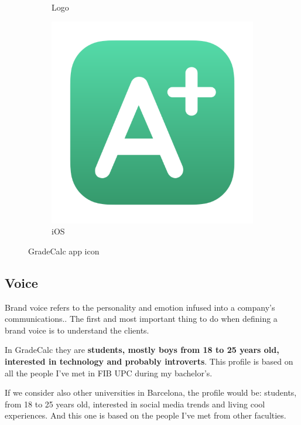 \begin{figure}[ht!]
\begin{subfigure}[]{0.175\textwidth-0.1cm}
        \vspace*{-6mm}
        \caption{Logo}
    \end{subfigure}
    \hfill
    \begin{subfigure}[b]{0.2\textwidth-0.1cm}
        \centering
        \includegraphics[width=\columnwidth]{media/logo-gradecalc-ios-rounded-margin.png}
        \caption{iOS}
    \end{subfigure}
    \caption{GradeCalc app icon}
    \label{fig:gradecalc-app-icon}
\end{figure}
\vfill

\newpage
\subsection{Voice}

Brand voice refers to the personality and emotion infused into a company’s communications.\cite{voice-rules}. The first and most important thing to do when defining a brand voice is to understand the clients. 

In GradeCalc they are \textbf{students, mostly boys from 18 to 25 years old, interested in technology and probably introverts}. This profile is based on all the people I've met in FIB UPC during my bachelor's. 

If we consider also other universities in Barcelona, the profile would be: students, from 18 to 25 years old, interested in social media trends and living cool experiences. And this one is based on the people I've met from other faculties. 

